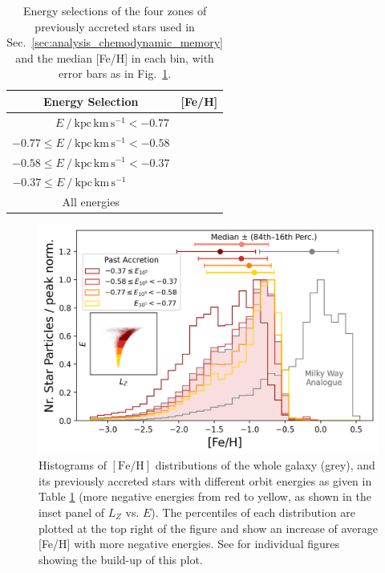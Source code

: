 \documentclass[fleqn,usenatbib]{mnras}
\begin{document}
\begin{table}
    \centering
    \renewcommand{\arraystretch}{1.5}
    \caption{Energy selections of the four zones of previously accreted stars used in Sec.~\ref{sec:analysis_chemodynamic_memory} and the median [Fe/H] in each bin, with error bars as in Fig.~\ref{fig:fe_h_histograms}.}
    \begin{tabular}{cc} 
    \hline\hline
    Energy Selection & {[Fe/H]} \\
    \hline
    $ \qquad \quad ~~~\, E~/~\mathrm{kpc\,km\,s^{-1}}<-0.77$ &  \\
    $-0.77 \leq E~/~\mathrm{kpc\,km\,s^{-1}} < -0.58$ &  \\
    $-0.58 \leq E~/~\mathrm{kpc\,km\,s^{-1}} < -0.37$ &  \\
    $ -0.37 \leq  E~/~\mathrm{kpc\,km\,s^{-1}}\qquad \quad ~~~\,$ &  \\
    \hline
    All energies &  \\
    \hline\hline
    \end{tabular}
    \label{tab:energy_selection}
\end{table}

\begin{figure}
    \centering
    \includegraphics[width=\columnwidth]{figures/fe_h_histograms.png}
    \caption{Histograms of ${\mathrm{[Fe/H]}}$ distributions of the whole galaxy (grey), and its previously accreted stars with different orbit energies as given in Table \ref{tab:energy_selection} (more negative energies from red to yellow, as shown in the inset panel of $L_Z$ vs. $E$). The percentiles of each distribution are plotted at the top right of the figure and show an increase of average [Fe/H] with more negative energies. See \href{https://github.com/svenbuder/gse_nihaouhd/tree/main/figures}{\faGithub} for individual figures showing the build-up of this plot.}
    \label{fig:fe_h_histograms}
\end{figure}
\end{document}
